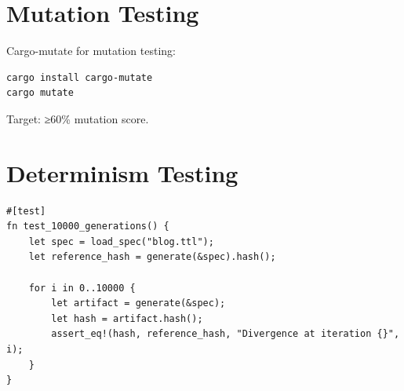 \section{Mutation Testing}

Cargo-mutate for mutation testing:

\begin{verbatim}
cargo install cargo-mutate
cargo mutate
\end{verbatim}

Target: ≥60\% mutation score.

\section{Determinism Testing}

\begin{verbatim}
#[test]
fn test_10000_generations() {
    let spec = load_spec("blog.ttl");
    let reference_hash = generate(&spec).hash();

    for i in 0..10000 {
        let artifact = generate(&spec);
        let hash = artifact.hash();
        assert_eq!(hash, reference_hash, "Divergence at iteration {}", i);
    }
}
\end{verbatim}
